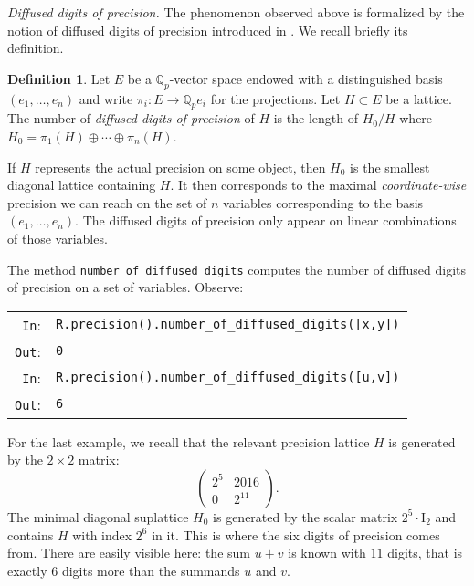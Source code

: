 \documentclass[sigconf]{acmart}
\newcommand{\Q}{\mathbb Q}
\newcommand{\Qp}{\Q_p}
\newcommand{\cIn}{{\color{blue} \tt \phantom{Zp}In}:}
\newcommand{\cOut}{{\color{red} \tt \phantom{Z}Out}:}
\theoremstyle{definition}
\newtheorem{deftn}[theo]{Definition}
\begin{document}
\medskip

\noindent \textit{Diffused digits of precision.}
%
The phenomenon observed above is formalized by the notion of
diffused digits of precision introduced in \cite{}. We recall
briefly its definition.

\begin{deftn}
\label{def:diffused}
Let $E$ be a $\Qp$-vector space endowed with a distinguished basis 
$(e_1, \ldots, e_n)$ and write $\pi_i : E \to \Qp e_i$ for the 
projections.
Let $H \subset E$ be a lattice. The number of \emph{diffused digits of 
precision} of $H$ is the length of $H_0/H$ where $H_0 = \pi_1(H) \oplus 
\cdots \oplus \pi_n(H)$.
\end{deftn}

If $H$ represents the actual precision on some object, then
$H_0$ is the smallest diagonal lattice containing $H$. It then
corresponds to the maximal \emph{coordinate-wise} precision we can 
reach on the set of $n$ variables corresponding to the basis $(e_1,
\ldots, e_n)$.
The diffused digits of precision only appear on linear combinations
of those variables.

The method \verb?number_of_diffused_digits? computes the number of
diffused digits of precision on a set of variables. Observe:

\smallskip

\noindent
\begin{tabular}{rl}
\cIn  & \verb?R.precision().number_of_diffused_digits([x,y])? \\
\cOut & \verb?0? \\
\cIn  & \verb?R.precision().number_of_diffused_digits([u,v])? \\
\cOut & \verb?6? \\
\end{tabular}

\smallskip

\noindent
For the last example, we recall that the relevant precision lattice 
$H$ is generated by the $2 \times 2$ matrix:
$$\left(\begin{matrix} 2^5 & 2016 \\ 0 & 2^{11} \end{matrix}\right).$$
The minimal diagonal suplattice $H_0$ is generated by the scalar matrix 
$2^5 \cdot \text{I}_2$ and contains $H$ with index $2^6$ in it. This is 
where the six digits of precision comes from.
There are easily visible here: the sum $u+v$ is known with $11$ digits,
that is exactly $6$ digits more than the summands $u$ and $v$.
\end{document}
